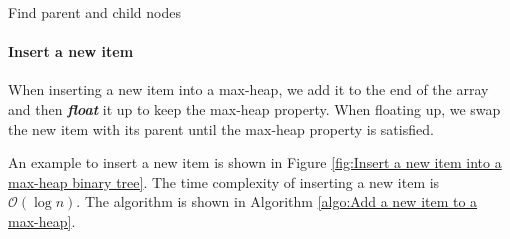 \documentclass[12pt,a4paper]{ctexart}
\newcommand{\highlight}[1]{\textbf{\textit{#1}}}
\begin{document}
    \begin{algorithm}[!htbp]
        \caption{Find parent and child nodes}
        \label{algo:Find parent and child nodes}

        \BlankLine


        \BlankLine

    \end{algorithm}

    \paragraph{Insert a new item}

    When inserting a new item into a max-heap, we add it to the end of the array and then \highlight{float} it up to keep the max-heap property. When floating up, we swap the new item with its parent until the max-heap property is satisfied.
    
    An example to insert a new item is shown in Figure \ref{fig:Insert a new item into a max-heap binary tree}. The time complexity of inserting a new item is $\mathcal O(\log n)$. The algorithm is shown in Algorithm \ref{algo:Add a new item to a max-heap}.
\end{document}
